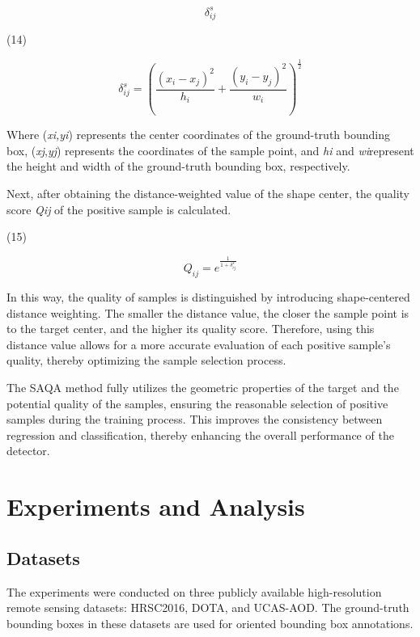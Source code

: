 \documentclass[journal]{IEEEtran}
\begin{document}
\begin{equation}
\delta^s_{ij}
\label{eq:eq_56}
\end{equation}

(14)

\begin{equation}
\delta_{ij}^s = \left( \frac{(x_i - x_j)^2}{h_i} + \frac{(y_i - y_j)^2}{w_i} \right)^{\frac{1}{2}}
\label{eq:eq_57}
\end{equation}

Where (\textit{x}\textit{i}\textit{,y}\textit{i}) represents the center coordinates of the ground-truth bounding box, (\textit{x}\textit{j}​,\textit{y}\textit{j}​) represents the coordinates of the sample point, and \textit{h}\textit{i}​ and \textit{w}\textit{i}​ represent the height and width of the ground-truth bounding box, respectively.

Next, after obtaining the distance-weighted value of the shape center, the quality score \textit{Q}\textit{ij }of the positive sample is calculated.

(15)

\begin{equation}
Q_{ij} = e^{\frac{1}{1 + \delta^s_{ij}}}
\label{eq:eq_58}
\end{equation}

In this way, the quality of samples is distinguished by introducing shape-centered distance weighting. The smaller the distance value, the closer the sample point is to the target center, and the higher its quality score. Therefore, using this distance value allows for a more accurate evaluation of each positive sample's quality, thereby optimizing the sample selection process.

The SAQA method fully utilizes the geometric properties of the target and the potential quality of the samples, ensuring the reasonable selection of positive samples during the training process. This improves the consistency between regression and classification, thereby enhancing the overall performance of the detector.

\section{ Experiments and Analysis }

\subsection{ Datasets }

The experiments were conducted on three publicly available high-resolution remote sensing datasets: HRSC2016, DOTA, and UCAS-AOD. The ground-truth bounding boxes in these datasets are used for oriented bounding box annotations.
\end{document}
